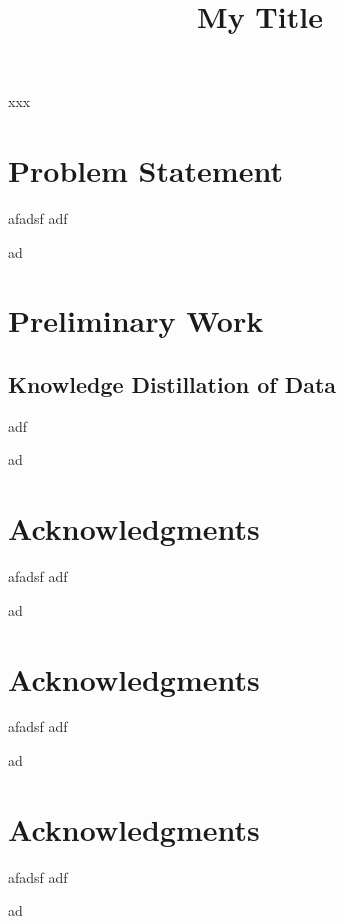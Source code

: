 \documentclass[conference,onecolumn]{IEEEtran}
\begin{document}
\title{My Title}  


\author{\IEEEauthorblockN{}
}



\maketitle


\begin{IEEEkeywords}
xxx
\end{IEEEkeywords}


%



\section*{Problem Statement}
afadsf
adf

ad
\section*{Preliminary Work}
\subsection{Knowledge Distillation of Data}
adf

ad
\section*{Acknowledgments}
afadsf
adf

ad
\section*{Acknowledgments}
afadsf
adf

ad
\section*{Acknowledgments}
afadsf
adf

ad




\balance
\begin{spacing}{0.88}


\end{spacing}

\end{document}
